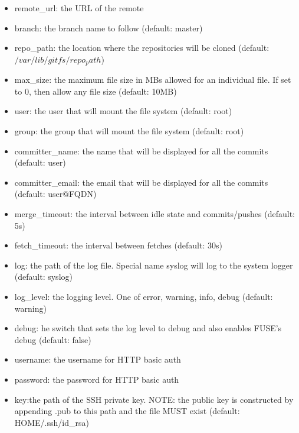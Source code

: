 \begin{itemize}
    \item remote\_url: the URL of the remote
    \item branch: the branch name to follow (default: master)
    \item repo\_path: the location where the repositories will be cloned
    (default: $/var/lib/gitfs/repo_path$)
    \item max\_size: the maximum file size in MBs allowed for an individual file. If set to 0, then allow any file size (default: 10MB)
    \item user: the user that will mount the file system (default: root)
    \item group: the group that will mount the file system (default: root)
    \item committer\_name: the name that will be displayed for all the commits (default: user)
    \item committer\_email: the email that will be displayed for all the commits (default: user@FQDN)
    \item merge\_timeout:	the interval between idle state and commits/pushes (default: 5s)
    \item fetch\_timeout: 	the interval between fetches (default: 30s)
    \item log: the path of the log file. Special name syslog will log to the system logger (default: syslog)
    \item log\_level: the logging level. One of error, warning, info, debug (default: warning)
    \item debug: he switch that sets the log level to debug and also enables FUSE’s debug (default: false)
    \item username: the username for HTTP basic auth 
    \item password: the password for HTTP basic auth
    \item key:the path of the SSH private key. NOTE: the public key is constructed by appending .pub to this path and the file MUST exist (default: \textdollar HOME/.ssh/id\_rsa)
\end{itemize}